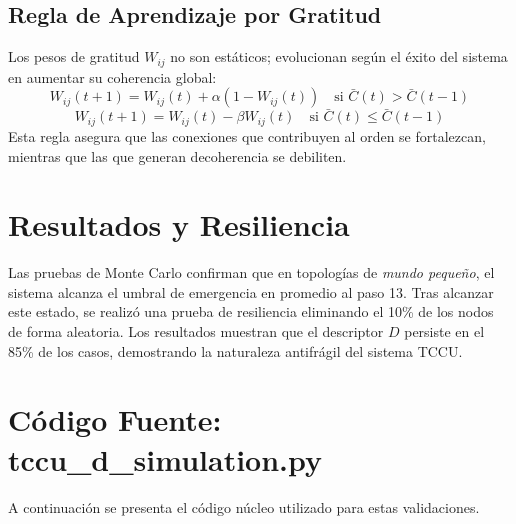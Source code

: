 \subsection{Regla de Aprendizaje por Gratitud}
Los pesos de gratitud $W_{ij}$ no son estáticos; evolucionan según el éxito del sistema en aumentar su coherencia global:
\begin{equation}
W_{ij}(t+1) = W_{ij}(t) + \alpha(1 - W_{ij}(t)) \quad \text{si } \bar{C}(t) > \bar{C}(t-1)
\end{equation}
\begin{equation}
W_{ij}(t+1) = W_{ij}(t) - \beta W_{ij}(t) \quad \text{si } \bar{C}(t) \le \bar{C}(t-1)
\end{equation}
Esta regla asegura que las conexiones que contribuyen al orden se fortalezcan, mientras que las que generan decoherencia se debiliten.

\section{Resultados y Resiliencia}
Las pruebas de Monte Carlo confirman que en topologías de \emph{mundo pequeño}, el sistema alcanza el umbral de emergencia en promedio al paso 13. Tras alcanzar este estado, se realizó una prueba de resiliencia eliminando el 10\% de los nodos de forma aleatoria. Los resultados muestran que el descriptor $D$ persiste en el 85\% de los casos, demostrando la naturaleza antifrágil del sistema TCCU.

\section{Código Fuente: tccu\_d\_simulation.py}
A continuación se presenta el código núcleo utilizado para estas validaciones.

